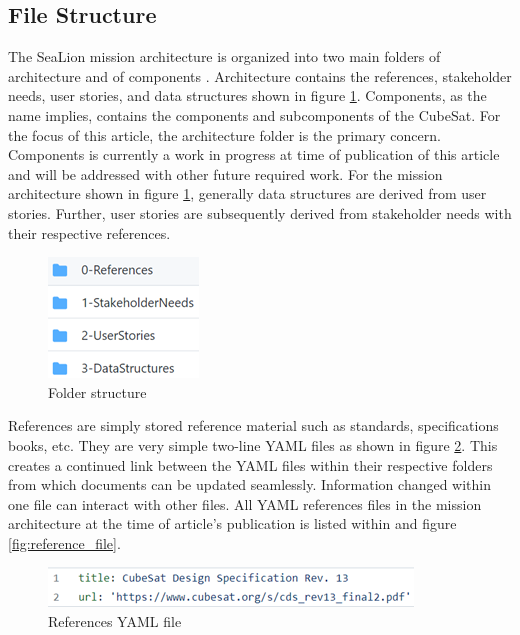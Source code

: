 \documentclass[journal,article,submit,pdftex,moreauthors]{Definitions/mdpi}
\begin{document}
\subsection{File Structure}
The SeaLion mission architecture is organized into two main folders of architecture and of components \cite{sealion_mission_architecture}.  Architecture contains the references, stakeholder needs, user stories, and data structures shown in figure \ref{fig:folders}.  Components, as the name implies, contains the components and subcomponents of the CubeSat.  For the focus of this article, the architecture folder is the primary concern.  Components is currently a work in progress at time of publication of this article and will be addressed with other future required work.  For the mission architecture shown in figure \ref{fig:folders}, generally data structures are derived from user stories.  Further, user stories are subsequently derived from stakeholder needs with their respective references.

\begin{figure}[H]
    \includegraphics{assets/folders.png}
    \caption{Folder structure}
	\label{fig:folders}
    \end{figure}
	\noindent   
\unskip

References are simply stored reference material such as standards, specifications books, etc.  They are very simple two-line YAML files as shown in figure \ref{fig:reference_yaml}.  This creates a continued link between the YAML files within their respective folders from which documents can be updated seamlessly.  Information changed within one file can interact with other files.  All YAML references files in the mission architecture at the time of article's publication is listed within and figure \ref{fig:reference_file}. 

\begin{figure}[H]
    \includegraphics[width=10 cm]{assets/reference.png}
    \caption{References YAML file}
	\label{fig:reference_yaml}
    \end{figure}   
\unskip
\end{document}
